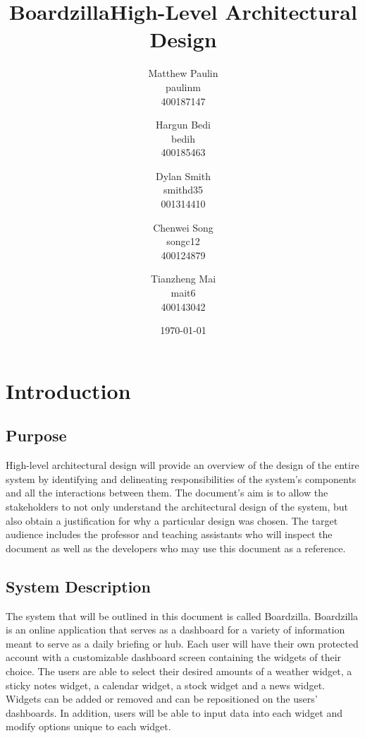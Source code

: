 \documentclass[]{article}
\title{\textbf{Boardzilla\break High-Level Architectural Design}}
\author{Matthew Paulin \\ paulinm \\ 400187147 \and
        Hargun Bedi \\ bedih \\ 400185463 \and
        Dylan Smith \\ smithd35 \\ 001314410 \and
        Chenwei Song \\ songc12 \\ 400124879 \and
        Tianzheng Mai \\ mait6 \\ 400143042
}
\date{\today}
\begin{document}
\maketitle	
\newpage
\tableofcontents
\newpage
\section{Introduction}
\label{sec:introduction}


\subsection{Purpose}
\label{sub:purpose}
High-level architectural design will provide an overview of the design of the entire system by identifying and delineating responsibilities of the system's components and all the interactions between them. The document's aim is to allow the stakeholders to not only understand the architectural design of the system, but also obtain a justification for why a particular design was chosen. The target audience includes the professor and teaching assistants who will inspect the document as well as the developers who may use this document as a reference.


\subsection{System Description}
\label{sub:system_description}
The system that will be outlined in this document is called Boardzilla. Boardzilla is an online application that serves as a dashboard for a variety of information meant to serve as a daily briefing or hub. Each user will have their own protected account with a customizable dashboard screen containing the widgets of their choice. The users are able to select their desired amounts of a weather widget, a sticky notes widget, a calendar widget, a stock widget and a news widget. Widgets can be added or removed and can be repositioned on the users' dashboards. In addition, users will be able to input data into each widget and modify options unique to each widget.
\end{document}
